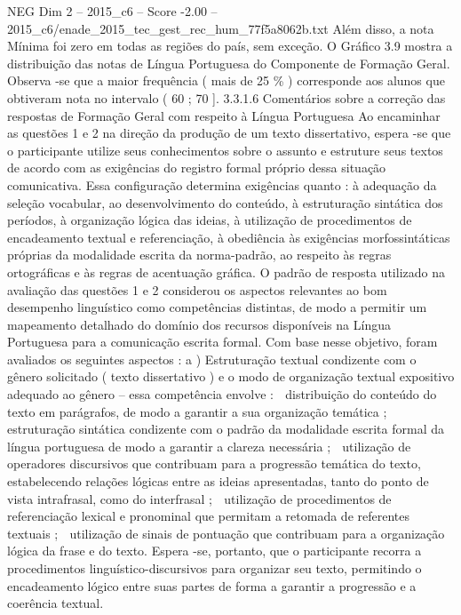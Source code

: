\begin{textsample}{NEG Dim 2 – 2015\_c6 – Score -2.00 – 2015\_c6/enade\_2015\_tec\_gest\_rec\_hum\_77f5a8062b.txt}
Além disso, a nota Mínima foi zero em todas as regiões do país, sem exceção.
O Gráfico 3.9 mostra a distribuição das notas de Língua Portuguesa do Componente de Formação Geral.
Observa -se que a maior frequência ( mais de 25 \% ) corresponde aos alunos que obtiveram nota no intervalo ( 60 ; 70 ]. 3.3.1.6 Comentários sobre a correção das respostas de Formação Geral com respeito à Língua Portuguesa Ao encaminhar as questões 1 e 2 na direção da produção de um texto dissertativo, espera -se que o participante utilize seus conhecimentos sobre o assunto e estruture seus textos de acordo com as exigências do registro formal próprio dessa situação comunicativa.
Essa configuração determina exigências quanto : à adequação da seleção vocabular, ao desenvolvimento do conteúdo, à estruturação sintática dos períodos, à organização lógica das ideias, à utilização de procedimentos de encadeamento textual e referenciação, à obediência às exigências morfossintáticas próprias da modalidade escrita da norma-padrão, ao respeito às regras ortográficas e às regras de acentuação gráfica.
O padrão de resposta utilizado na avaliação das questões 1 e 2 considerou os aspectos relevantes ao bom desempenho linguístico como competências distintas, de modo a permitir um mapeamento detalhado do domínio dos recursos disponíveis na Língua Portuguesa para a comunicação escrita formal.
Com base nesse objetivo, foram avaliados os seguintes aspectos : a ) Estruturação textual condizente com o gênero solicitado ( texto dissertativo ) e o modo de organização textual expositivo adequado ao gênero – essa competência envolve :  distribuição do conteúdo do texto em parágrafos, de modo a garantir a sua organização temática ;  estruturação sintática condizente com o padrão da modalidade escrita formal da língua portuguesa de modo a garantir a clareza necessária ;  utilização de operadores discursivos que contribuam para a progressão temática do texto, estabelecendo relações lógicas entre as ideias apresentadas, tanto do ponto de vista intrafrasal, como do interfrasal ;  utilização de procedimentos de referenciação lexical e pronominal que permitam a retomada de referentes textuais ;  utilização de sinais de pontuação que contribuam para a organização lógica da frase e do texto.
Espera -se, portanto, que o participante recorra a procedimentos linguístico-discursivos para organizar seu texto, permitindo o encadeamento lógico entre suas partes de forma a garantir a progressão e a coerência textual.

\end{textsample}

